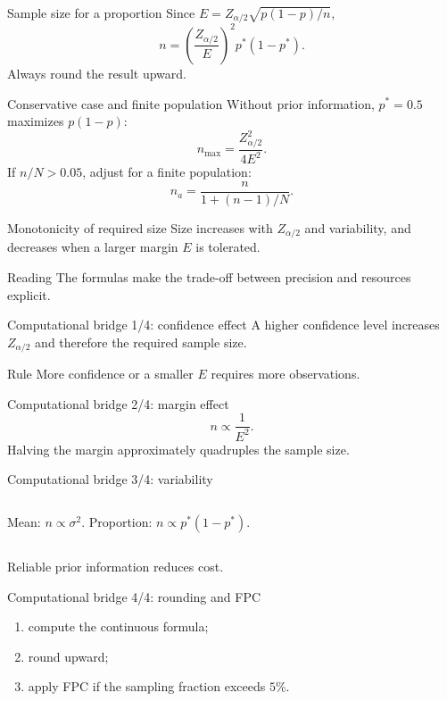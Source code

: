 \documentclass[10pt,aspectratio=169]{beamer}
\begin{document}
\begin{frame}{Sample size for a proportion}
  \footnotesize
  Since $E=Z_{\alpha/2}\sqrt{p(1-p)/n}$,
  \[
    n=\left(\frac{Z_{\alpha/2}}{E}\right)^2p^*(1-p^*).
  \]
  Always round the result upward.
\end{frame}

\begin{frame}{Conservative case and finite population}
  \footnotesize
  Without prior information, $p^*=0.5$ maximizes $p(1-p)$:
  \[
    n_{\max}=\frac{Z_{\alpha/2}^2}{4E^2}.
  \]
  If $n/N>0.05$, adjust for a finite population:
  \[
    n_a=\frac{n}{1+(n-1)/N}.
  \]
\end{frame}

\begin{frame}{Monotonicity of required size}
  \footnotesize
  Size increases with $Z_{\alpha/2}$ and variability, and decreases when a
  larger margin $E$ is tolerated.
  \begin{alertblock}{Reading}
    The formulas make the trade-off between precision and resources explicit.
  \end{alertblock}
\end{frame}

\begin{frame}{Computational bridge 1/4: confidence effect}
  \footnotesize
  A higher confidence level increases $Z_{\alpha/2}$ and therefore the required
  sample size.
  \begin{block}{Rule}
    More confidence or a smaller $E$ requires more observations.
  \end{block}
\end{frame}

\begin{frame}{Computational bridge 2/4: margin effect}
  \footnotesize
  \[
    n\propto\frac1{E^2}.
  \]
  Halving the margin approximately quadruples the sample size.
\end{frame}

\begin{frame}{Computational bridge 3/4: variability}
  \footnotesize
  \begin{columns}[T]
      Mean: $n\propto\sigma^2$.
      Proportion: $n\propto p^*(1-p^*)$.
  \end{columns}
  \vspace{0.2cm}
  Reliable prior information reduces cost.
\end{frame}

\begin{frame}{Computational bridge 4/4: rounding and FPC}
  \footnotesize
  \begin{enumerate}\itemsep=0.12cm
    \item compute the continuous formula;
    \item round upward;
    \item apply FPC if the sampling fraction exceeds $5\%$.
  \end{enumerate}
\end{frame}
\end{document}
